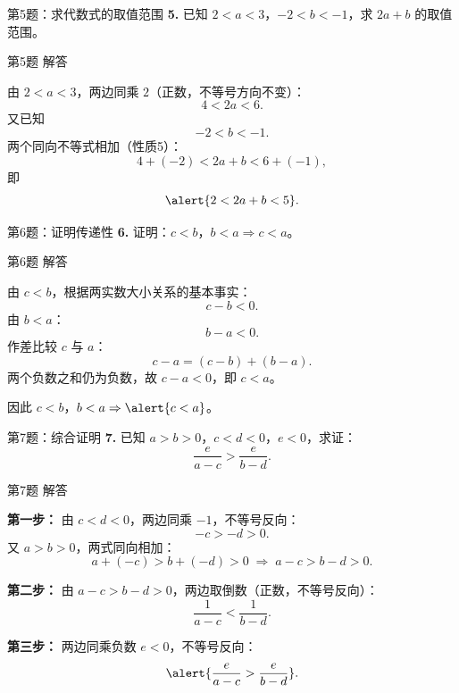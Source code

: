 \documentclass[10pt,aspectratio=169,serif]{beamer}
\begin{document}
\begin{frame}[t]{第5题：求代数式的取值范围}
\textbf{5.} 已知 $2<a<3$，$-2<b<-1$，求 $2a+b$ 的取值范围。
\end{frame}

\begin{frame}[t]{第5题 解答}
\begin{tcolorbox}[colback=orange!10,colframe=orange,title=\textbf{解}]
由 $2<a<3$，两边同乘 $2$（正数，不等号方向不变）：
\[
4 < 2a < 6.
\]
又已知
\[
-2 < b < -1.
\]
两个同向不等式相加（性质5）：
\[
4+(-2) < 2a+b < 6+(-1),
\]
即
\[
\alert{2 < 2a+b < 5}.
\]
\end{tcolorbox}
\end{frame}

\begin{frame}[t]{第6题：证明传递性}
\textbf{6.} 证明：$c<b$，$b<a \Rightarrow c<a$。
\end{frame}

\begin{frame}[t]{第6题 解答}
\begin{tcolorbox}[colback=orange!10,colframe=orange,title=\textbf{证明}]
由 $c<b$，根据两实数大小关系的基本事实：
\[
c-b<0.
\]
由 $b<a$：
\[
b-a<0.
\]
作差比较 $c$ 与 $a$：
\[
c-a = (c-b)+(b-a).
\]
两个负数之和仍为负数，故 $c-a<0$，即 $c<a$。

\vspace{0.5em}
因此 $c<b$，$b<a \Rightarrow \alert{c<a}$。
\end{tcolorbox}
\end{frame}

\begin{frame}[t]{第7题：综合证明}
\textbf{7.} 已知 $a>b>0$，$c<d<0$，$e<0$，求证：
\[
\frac{e}{a-c} > \frac{e}{b-d}.
\]
\end{frame}

\begin{frame}[t]{第7题 解答}
\begin{tcolorbox}[colback=orange!10,colframe=orange,title=\textbf{证明}]
\textbf{第一步：} 由 $c<d<0$，两边同乘 $-1$，不等号反向：
\[
-c > -d > 0.
\]
又 $a>b>0$，两式同向相加：
\[
a+(-c) > b+(-d) > 0 \;\Longrightarrow\; a-c > b-d > 0.
\]

\textbf{第二步：} 由 $a-c>b-d>0$，两边取倒数（正数，不等号反向）：
\[
\frac{1}{a-c} < \frac{1}{b-d}.
\]

\textbf{第三步：} 两边同乘负数 $e<0$，不等号反向：
\[
\alert{\frac{e}{a-c} > \frac{e}{b-d}}.
\]
\end{tcolorbox}
\end{frame}
\end{document}
